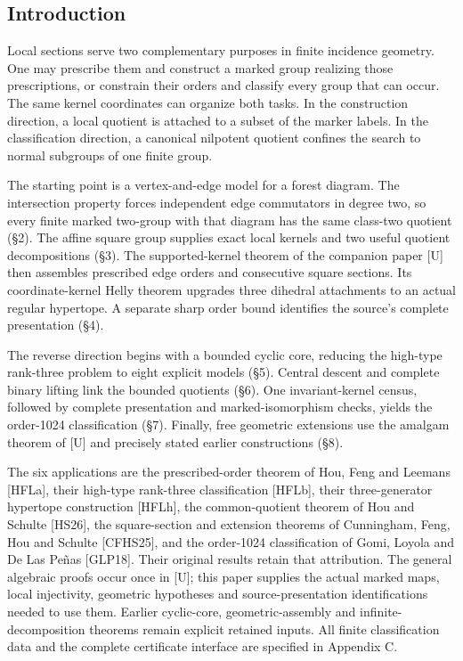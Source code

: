 \documentclass[
  11pt,
  a4paper,
]{article}
\begin{document}
\subsection{Introduction}\label{introduction}

Local sections serve two complementary purposes in finite incidence
geometry. One may prescribe them and construct a marked group realizing
those prescriptions, or constrain their orders and classify every group
that can occur. The same kernel coordinates can organize both tasks. In
the construction direction, a local quotient is attached to a subset of
the marker labels. In the classification direction, a canonical
nilpotent quotient confines the search to normal subgroups of one finite
group.

The starting point is a vertex-and-edge model for a forest diagram. The
intersection property forces independent edge commutators in degree two,
so every finite marked two-group with that diagram has the same
class-two quotient (§2). The affine square group supplies exact local
kernels and two useful quotient decompositions (§3). The
supported-kernel theorem of the companion paper {[}U{]} then assembles
prescribed edge orders and consecutive square sections. Its
coordinate-kernel Helly theorem upgrades three dihedral attachments to
an actual regular hypertope. A separate sharp order bound identifies the
source's complete presentation (§4).

The reverse direction begins with a bounded cyclic core, reducing the
high-type rank-three problem to eight explicit models (§5). Central
descent and complete binary lifting link the bounded quotients (§6). One
invariant-kernel census, followed by complete presentation and
marked-isomorphism checks, yields the order-1024 classification (§7).
Finally, free geometric extensions use the amalgam theorem of {[}U{]}
and precisely stated earlier constructions (§8).

The six applications are the prescribed-order theorem of Hou, Feng and
Leemans {[}HFLa{]}, their high-type rank-three classification
{[}HFLb{]}, their three-generator hypertope construction {[}HFLh{]}, the
common-quotient theorem of Hou and Schulte {[}HS26{]}, the
square-section and extension theorems of Cunningham, Feng, Hou and
Schulte {[}CFHS25{]}, and the order-1024 classification of Gomi, Loyola
and De Las Peñas {[}GLP18{]}. Their original results retain that
attribution. The general algebraic proofs occur once in {[}U{]}; this
paper supplies the actual marked maps, local injectivity, geometric
hypotheses and source-presentation identifications needed to use them.
Earlier cyclic-core, geometric-assembly and infinite-decomposition
theorems remain explicit retained inputs. All finite classification data
and the complete certificate interface are specified in Appendix C.
\end{document}
